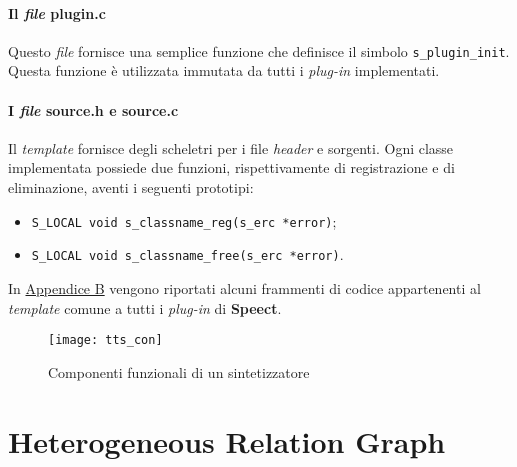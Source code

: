 \paragraph{Il \textit{file} plugin.c}
Questo \textit{file} fornisce una semplice funzione che definisce il simbolo \texttt{s\_plugin\_init}.
Questa funzione è utilizzata immutata da tutti i \textit{plug-in} implementati.
\paragraph{I \textit{file} source.h e source.c}
Il \textit{template} fornisce degli scheletri per i file \textit{header} e sorgenti. Ogni classe implementata 
possiede due funzioni, rispettivamente di registrazione e di eliminazione, aventi i seguenti prototipi:
   \begin{itemize}
       \item \texttt{S\_LOCAL void s\_classname\_reg(s\_erc *error)};
       \item \texttt{S\_LOCAL void s\_classname\_free(s\_erc *error)}.
   \end{itemize}
In \hyperref[app:appb]{Appendice B} vengono riportati alcuni frammenti di codice appartenenti
al \textit{template} comune a tutti i \textit{plug-in} di \textbf{Speect}.
\newpage

\begin{figure}[!h] 
    \centering 
    \texttt{[image: tts\_con]} 
    \caption{Componenti funzionali di un sintetizzatore}
\end{figure}


\section{Heterogeneous Relation Graph}
